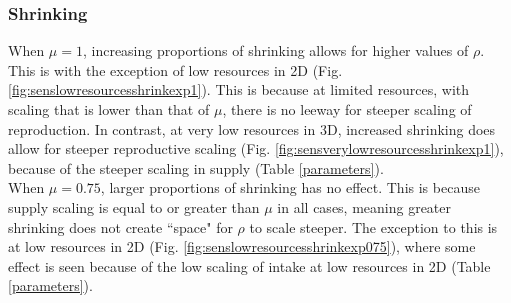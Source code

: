 \documentclass[a4paper, 11pt, hidelinks]{article} %
\begin{document}
	\subsubsection{Shrinking}
	When $ \mu = 1$, increasing proportions of shrinking allows for higher values of $ \rho $.  This is with the exception of low resources in 2D (Fig. \ref{fig:senslowresourcesshrinkexp1}).  This is because at limited resources, with scaling that is lower than that of $ \mu $, there is no leeway for steeper scaling of reproduction.  In contrast, at very low resources in 3D, increased shrinking does allow for steeper reproductive scaling (Fig. \ref{fig:sensverylowresourcesshrinkexp1}), because of the steeper scaling in supply (Table \ref{parameters}).
	\\
	When $ \mu = 0.75 $, larger proportions of shrinking has no effect.  This is because supply scaling is equal to or greater than $ \mu $ in all cases, meaning greater shrinking does not create ``space" for $ \rho $ to scale steeper.  The exception to this is at low resources in 2D (Fig. \ref{fig:senslowresourcesshrinkexp075}), where some effect is seen because of the low scaling of intake at low resources in 2D (Table \ref{parameters}).

	\nolinenumbers
	
\end{document}
